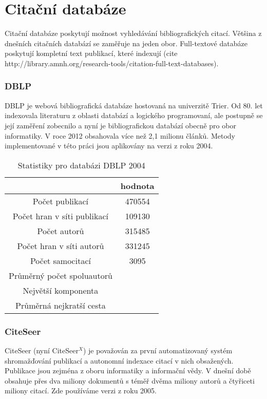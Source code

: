 \documentclass[12pt,titlepage]{report}
\begin{document}
\chapter{Citační databáze}
Citační databáze poskytují možnost vyhledávání bibliografických citací. Většina
z dnešních citačních databází se zaměřuje na jeden obor. Full-textové databáze
poskytují kompletní text publikací, které indexují (cite
http://library.amnh.org/research-tools/citation-full-text-databases).

\subsection{DBLP}
DBLP \cite{DBLP} je webová bibliografická databáze hostovaná na univerzitě
Trier. Od 80.  let indexovala literaturu z oblasti databází a logického
programovaní, ale postupně se její zaměření zobecnilo a nyní je bibliografickou
databází obecně pro obor informatiky. V roce 2012 obsahovala více než 2,1
milionu článků. Metody implementované v této práci jsou aplikovány na verzi z
roku 2004. 

\begin{table}[!ht]
\begin{center}
\begin{tabular}{cc}
\hline
& hodnota \\
\hline
Počet publikací & 470554 \\
Počet hran v síti publikací & 109130 \\
Počet autorů & 315485 \\
Počet hran v síti autorů & 331245 \\
Počet samocitací & 3095 \\
Průměrný počet spoluautorů & \\
Největší komponenta & \\
Průměrná nejkratší cesta & \\
\hline
\end{tabular}
\caption{Statistiky pro databázi DBLP 2004}
\label{tab:dblpstat}
\end{center}
\end{table}


\subsection{CiteSeer}
CiteSeer (nyní CiteSeer$^X$) \cite{citeseer} je považován za první
automatizovaný systém shromažďování publikací a autonomní indexace citací v
nich obsažených. Publikace jsou zejména z oboru informatiky a informační vědy.
V dnešní době obsahuje přes dva miliony dokumentů s téměř dvěma miliony autorů
a čtyřiceti miliony citací. Zde používáme verzi z roku 2005.
\end{document}

